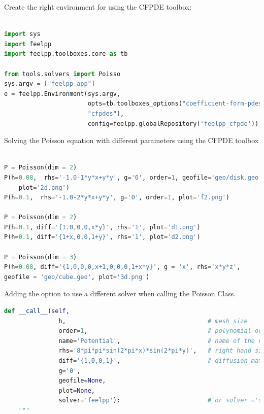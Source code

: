 \documentclass[12pt]{article}
\begin{document}
Create the right environment for using the CFPDE toolbox:
\begin{lstlisting}[language=python,caption={},frame=single, backgroundcolor=\color{gray!10}, basicstyle=\footnotesize,rulecolor=\color{blue}, framexleftmargin=3pt, commentstyle=\color{mygreen}, keywordstyle=\color{blue}]

import sys
import feelpp
import feelpp.toolboxes.core as tb

from tools.solvers import Poisso
sys.argv = ["feelpp_app"]
e = feelpp.Environment(sys.argv,
                       opts=tb.toolboxes_options("coefficient-form-pdes", 
                       "cfpdes"),
                       config=feelpp.globalRepository('feelpp_cfpde'))

\end{lstlisting}

Solving the Poisson equation with different parameters using the CFPDE toolbox

\begin{lstlisting}[language=Python,caption={},frame=single, backgroundcolor=\color{gray!10}, basicstyle=\footnotesize,rulecolor=\color{blue}, framexleftmargin=3pt, commentstyle=\color{mygreen}, keywordstyle=\color{blue}]

P = Poisson(dim = 2)
P(h=0.08,  rhs='-1.0-1*y*x+y*y', g='0', order=1, geofile='geo/disk.geo',
    plot='2d.png')
P(h=0.1,  rhs='-1.0-2*y*x+y*y', g='0', order=1, plot='f2.png')

P = Poisson(dim = 2)
P(h=0.1, diff='{1.0,0,0,x*y}', rhs='1', plot='d1.png')
P(h=0.1, diff='{1+x,0,0,1+y}', rhs='1', plot='d2.png')

P = Poisson(dim = 3)
P(h=0.08, diff='{1,0,0,0,x+1,0,0,0,1+x*y}', g = 'x', rhs='x*y*z', 
geofile = 'geo/cube.geo', plot='3d.png') 

\end{lstlisting}

Adding the option to use a different solver when calling the Poisson Class.
\begin{lstlisting}[language=Python,caption={},frame=single, backgroundcolor=\color{gray!10}, basicstyle=\footnotesize,rulecolor=\color{blue}, framexleftmargin=3pt, commentstyle=\color{mygreen}, keywordstyle=\color{blue}]
def __call__(self,
               h,                                       # mesh size 
               order=1,                                 # polynomial order 
               name='Potential',                        # name of the variable
               rhs='8*pi*pi*sin(2*pi*x)*sin(2*pi*y)',   # right hand side
               diff='{1,0,0,1}',                        # diffusion matrix
               g='0',
               geofile=None,
               plot=None,
               solver='feelpp'):                        # or solver ='scimba'
    """
\end{lstlisting}
\end{document}
